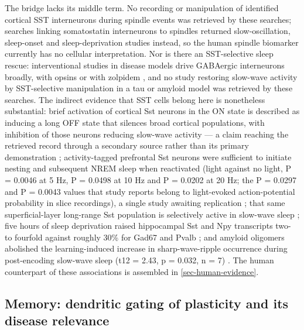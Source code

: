 \documentclass[11pt]{article}
\begin{document}
The bridge lacks its middle term. No recording or manipulation of identified cortical SST interneurons during spindle events was retrieved by these searches; searches linking somatostatin interneurons to spindles returned slow-oscillation, sleep-onset and sleep-deprivation studies instead, so the human spindle biomarker currently has no cellular interpretation. Nor is there an SST-selective sleep rescue: interventional studies in disease models drive GABAergic interneurons broadly, with opsins or with zolpidem \citep{Zhao2023,Yu2026}, and no study restoring slow-wave activity by SST-selective manipulation in a tau or amyloid model was retrieved by these searches. The indirect evidence that SST cells belong here is nonetheless substantial: brief activation of cortical Sst neurons in the ON state is described as inducing a long OFF state that silences broad cortical populations, with inhibition of those neurons reducing slow-wave activity --- a claim reaching the retrieved record through a secondary source rather than its primary demonstration \citep{Kobayashi2026}; activity-tagged prefrontal Sst neurons were sufficient to initiate nesting and subsequent NREM sleep when reactivated (light against no light, P = 0.0046 at 5 Hz, P = 0.0498 at 10 Hz and P = 0.0202 at 20 Hz; the P = 0.0297 and P = 0.0043 values that study reports belong to light-evoked action-potential probability in slice recordings), a single study awaiting replication \citep{Tossell2023}; that same superficial-layer long-range Sst population is selectively active in slow-wave sleep \citep{Ratliff2026}; five hours of sleep deprivation raised hippocampal Sst and Npy transcripts two- to fourfold against roughly 30\% for Gad67 and Pvalb \citep{Delorme2021}; and amyloid oligomers abolished the learning-induced increase in sharp-wave-ripple occurrence during post-encoding slow-wave sleep (t12 = 2.43, p = 0.032, n = 7) \citep{Nicole2016}. The human counterpart of these associations is assembled in \ref{sec-human-evidence}.

\subsection{Memory: dendritic gating of plasticity and its disease relevance}
\label{sec-08-memory}
\end{document}
